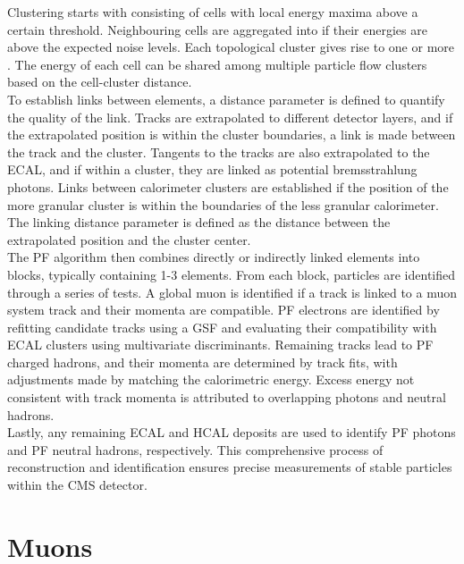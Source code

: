 Clustering starts with  consisting of cells with local energy maxima above a certain threshold. 
Neighbouring cells are aggregated into  if their energies are above the expected noise levels. 
Each topological cluster gives rise to one or more . 
The energy of each cell can be shared among multiple particle flow clusters based on the cell-cluster distance. \\

To establish links between elements, a distance parameter is defined to quantify the quality of the link. 
Tracks are extrapolated to different detector layers, and if the extrapolated position is within the cluster boundaries, a link is made between the track and the cluster. 
Tangents to the tracks are also extrapolated to the \ac{ECAL}, and if within a cluster, they are linked as potential bremsstrahlung photons. 
Links between calorimeter clusters are established if the position of the more granular cluster is within the boundaries of the less granular calorimeter. 
The linking distance parameter is defined as the distance between the extrapolated position and the cluster center. \\

The \ac{PF} algorithm then combines directly or indirectly linked elements into blocks, typically containing 1-3 elements. 
From each block, particles are identified through a series of tests. 
A global muon is identified if a track is linked to a muon system track and their momenta are compatible. 
\ac{PF} electrons are identified by refitting candidate tracks using a \ac{GSF} and evaluating their compatibility with \ac{ECAL} clusters using multivariate discriminants. 
Remaining tracks lead to \ac{PF} charged hadrons, and their momenta are determined by track fits, with adjustments made by matching the calorimetric energy. 
Excess energy not consistent with track momenta is attributed to overlapping photons and neutral hadrons. \\

Lastly, any remaining \ac{ECAL} and \ac{HCAL} deposits are used to identify \ac{PF} photons and \ac{PF} neutral hadrons, respectively. 
This comprehensive process of reconstruction and identification ensures precise measurements of stable particles within the \ac{CMS} detector.

\section{Muons}

